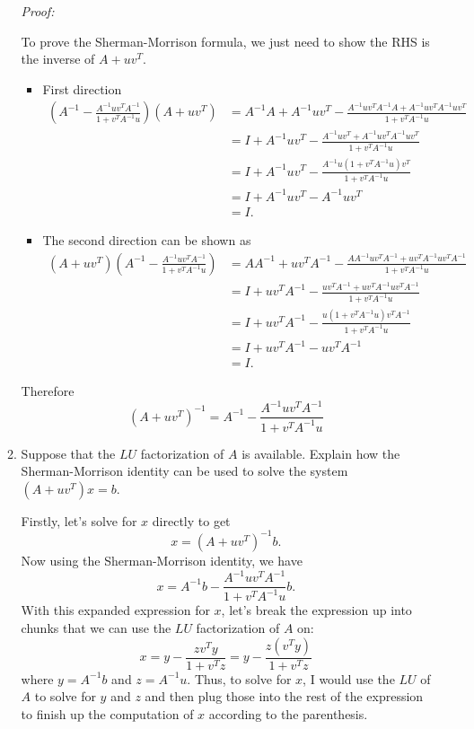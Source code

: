 \documentclass[a4paper,12pt]{article}
\newenvironment{proof}[2][$\square$]
    {\setlength{\parskip}{0pt}\par\textit{Proof:} #2\setlength{\parskip}{0.25cm}
        \savebox{\qed}{#1}
        \begin{adjustwidth}{\widthof{Proof:}}{}
    }
    {
        \hfill\usebox{\qed}\end{adjustwidth}
    }
\begin{document}
\begin{enumerate}[label = \arabic*.]
\begin{enumerate}[label = (\alph*)]
				\begin{proof}{}
					To prove the Sherman-Morrison formula, we just need to show the RHS is the inverse of $ A + uv^T $.
					\begin{itemize}
						\item First direction
						\begin{align*}
							\left(A^{-1} - \frac{A^{-1} u v^T A^{-1}}{1 + v^T A^{-1} u}\right) (A + u v^T) &= A^{-1}A + A^{-1}u v^T - \frac{A^{-1} u v^T A^{-1}A + A^{-1} u v^T A^{-1}uv^T}{1 + v^T A^{-1} u} \\
							&= I + A^{-1}u v^T - \frac{A^{-1} u v^T + A^{-1} u v^T A^{-1}u v^T}{1 + v^T A^{-1} u} \\
							&= I + A^{-1}u v^T - \frac{A^{-1} u (1 + v^T A^{-1}u) v^T}{1 + v^T A^{-1} u} \\
							&= I + A^{-1}u v^T - A^{-1}uv^T \\
							&= I.
						\end{align*}
					\item The second direction can be shown as
						\begin{align*}
							(A + u v^T) \left(A^{-1} - \frac{A^{-1} u v^T A^{-1}}{1 + v^T A^{-1} u}\right) &= AA^{-1} + u v^TA^{-1} - \frac{AA^{-1} u v^T A^{-1} + uv^TA^{-1} u v^T A^{-1}}{1 + v^T A^{-1} u} \\
							&= I + u v^TA^{-1} - \frac{u v^TA^{-1}  + u v^T A^{-1} u v^T A^{-1}}{1 + v^T A^{-1} u} \\
							&= I + u v^TA^{-1} - \frac{u(1 + v^T A^{-1}u) v^TA^{-1}}{1 + v^T A^{-1} u} \\
							&= I + u v^TA^{-1} - uv^TA^{-1} \\
							&= I.
						\end{align*}
					\end{itemize}
					Therefore
					\[
						(A + u v^T)^{-1} = A^{-1} - \frac{A^{-1} u v^T A^{-1}}{1 + v^T A^{-1} u}
					\]
				\end{proof}
			
				\item Suppose that the $ LU $ factorization of $ A $ is available. Explain how the Sherman-Morrison identity can be used to solve the system $ (A + uv^T)x = b $.
				
				Firstly, let's solve for $ x $ directly to get
				\[
					x = (A + uv^T)^{-1} b.
				\]
				Now using the Sherman-Morrison identity, we have
				\[
					x = A^{-1}b - \frac{A^{-1} u v^T A^{-1}}{1 + v^T A^{-1} u}b.
				\]
				With this expanded expression for $ x $, let's break the expression up into chunks that we can use the $ LU $ factorization of $ A $ on:
				\[
					x = y - \frac{z v^T y}{1 + v^T z} = y - \frac{z (v^T y)}{1 + v^T z}
				\]
				where $ y = A^{-1}b $ and $ z = A^{-1}u $. Thus, to solve for $ x $, I would use the $ LU $ of $ A $ to solve for $ y $ and $ z $ and then plug those into the rest of the expression to finish up the computation of $ x $ according to the parenthesis. 
				

\end{enumerate}
\end{enumerate}
\end{document}
